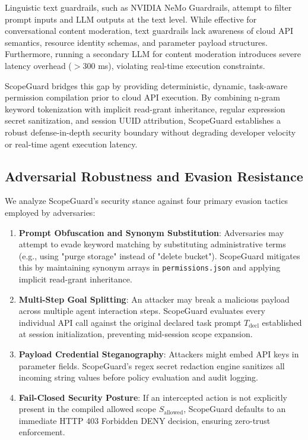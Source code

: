 \documentclass[conference]{IEEEtran}
\begin{document}
Linguistic text guardrails, such as NVIDIA NeMo Guardrails, attempt to filter prompt inputs and LLM outputs at the text level. While effective for conversational content moderation, text guardrails lack awareness of cloud API semantics, resource identity schemas, and parameter payload structures. Furthermore, running a secondary LLM for content moderation introduces severe latency overhead ($>300$ ms), violating real-time execution constraints.

ScopeGuard bridges this gap by providing deterministic, dynamic, task-aware permission compilation prior to cloud API execution. By combining n-gram keyword tokenization with implicit read-grant inheritance, regular expression secret sanitization, and session UUID attribution, ScopeGuard establishes a robust defense-in-depth security boundary without degrading developer velocity or real-time agent execution latency.

\subsection{Adversarial Robustness and Evasion Resistance}
We analyze ScopeGuard's security stance against four primary evasion tactics employed by adversaries:
\begin{enumerate}
    \item \textbf{Prompt Obfuscation and Synonym Substitution}: Adversaries may attempt to evade keyword matching by substituting administrative terms (e.g., using "purge storage" instead of "delete bucket"). ScopeGuard mitigates this by maintaining synonym arrays in \texttt{permissions.json} and applying implicit read-grant inheritance.
    \item \textbf{Multi-Step Goal Splitting}: An attacker may break a malicious payload across multiple agent interaction steps. ScopeGuard evaluates every individual API call against the original declared task prompt $T_{\text{decl}}$ established at session initialization, preventing mid-session scope expansion.
    \item \textbf{Payload Credential Steganography}: Attackers might embed API keys in parameter fields. ScopeGuard's regex secret redaction engine sanitizes all incoming string values before policy evaluation and audit logging.
    \item \textbf{Fail-Closed Security Posture}: If an intercepted action is not explicitly present in the compiled allowed scope $S_{\text{allowed}}$, ScopeGuard defaults to an immediate HTTP 403 Forbidden DENY decision, ensuring zero-trust enforcement.
\end{enumerate}
\end{document}
